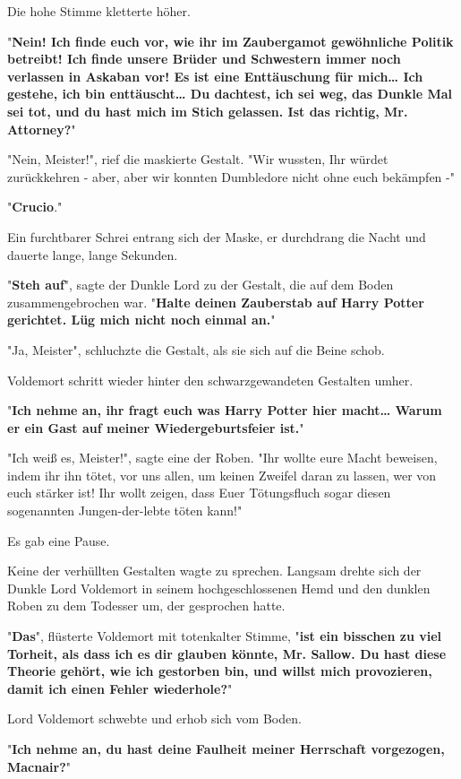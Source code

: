 {Die hohe Stimme kletterte höher.

"\textbf{Nein! Ich finde euch vor, wie ihr im Zaubergamot gewöhnliche Politik betreibt! Ich finde unsere Brüder und Schwestern immer noch verlassen in Askaban vor! Es ist eine Enttäuschung für mich… Ich gestehe, ich bin enttäuscht… Du dachtest, ich sei weg, das Dunkle Mal sei tot, und du hast mich im Stich gelassen. Ist das richtig, Mr. Attorney?}"

"Nein, Meister!", rief die maskierte Gestalt. "Wir wussten, Ihr würdet zurückkehren - aber, aber wir konnten Dumbledore nicht ohne euch bekämpfen -"

"\textbf{Crucio}."

Ein furchtbarer Schrei entrang sich der Maske, er durchdrang die Nacht und dauerte lange, lange Sekunden.

"\textbf{Steh auf}", sagte der Dunkle Lord zu der Gestalt, die auf dem Boden zusammengebrochen war. "\textbf{Halte deinen Zauberstab auf Harry Potter gerichtet. Lüg mich nicht noch einmal an.}"

"Ja, Meister", schluchzte die Gestalt, als sie sich auf die Beine schob.

Voldemort schritt wieder hinter den schwarzgewandeten Gestalten umher.

"\textbf{Ich nehme an, ihr fragt euch was Harry Potter hier macht… Warum er ein Gast auf meiner Wiedergeburtsfeier ist.}"

"Ich weiß es, Meister!", sagte eine der Roben. "Ihr wollte eure Macht beweisen, indem ihr ihn tötet, vor uns allen, um keinen Zweifel daran zu lassen, wer von euch stärker ist! Ihr wollt zeigen, dass Euer Tötungsfluch sogar diesen sogenannten Jungen-der-lebte töten kann!"

Es gab eine Pause.

Keine der verhüllten Gestalten wagte zu sprechen. Langsam drehte sich der Dunkle Lord Voldemort in seinem hochgeschlossenen Hemd und den dunklen Roben zu dem Todesser um, der gesprochen hatte.

"\textbf{Das}", flüsterte Voldemort mit totenkalter Stimme, "\textbf{ist ein bisschen zu viel Torheit, als dass ich es dir glauben könnte, Mr. Sallow. Du hast diese Theorie gehört, wie ich gestorben bin, und willst mich provozieren, damit ich einen Fehler wiederhole?}"

Lord Voldemort schwebte und erhob sich vom Boden.

"\textbf{Ich nehme an, du hast deine Faulheit meiner Herrschaft vorgezogen, Macnair?}"

}
